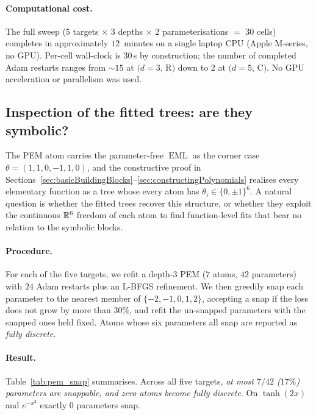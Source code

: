 \paragraph{Computational cost.}
The full sweep (5 targets $\times$ 3 depths $\times$ 2 parameterisations
$=$ 30 cells) completes in approximately $12$~minutes on a single laptop
CPU (Apple M-series, no GPU). Per-cell wall-clock is $30\,$s by
construction; the number of completed Adam restarts ranges from $\sim 15$
at $(d{=}3,\,$R$)$ down to $2$ at $(d{=}5,\,$C$)$. No GPU acceleration
or parallelism was used.

\subsection{Inspection of the fitted trees: are they symbolic?}
\label{sec:impl:inspection}

The PEM atom carries the parameter-free $\operatorname{EML}$ as the corner case
$\theta = (1, 1, 0, -1, 1, 0)$, and the constructive proof in
Sections~\ref{sec:basicBuildingBlocks}--\ref{sec:constructingPolynomials}
realises every elementary function as a tree whose every atom has
$\theta_i \in \{0, \pm 1\}^6$. A natural question is whether the fitted
trees recover this structure, or whether they exploit the continuous
$\mathbb R^6$ freedom of each atom to find function-level fits that bear no
relation to the symbolic blocks.

\paragraph{Procedure.}
For each of the five targets, we refit a depth-$3$ PEM ($7$ atoms,
$42$ parameters) with $24$ Adam restarts plus an L-BFGS refinement.
We then greedily snap each parameter to the nearest member of
$\{-2, -1, 0, 1, 2\}$, accepting a snap if the loss does not grow by
more than $30\%$, and refit the un-snapped parameters with the snapped
ones held fixed. Atoms whose six parameters all snap are reported as
\emph{fully discrete}.

\paragraph{Result.} Table~\ref{tab:pem_snap} summarises. Across all five
targets, \emph{at most $7/42$ ($17\%$) parameters are snappable, and
zero atoms become fully discrete}. On $\tanh(2x)$ and $e^{-x^2}$ exactly
$0$ parameters snap.

